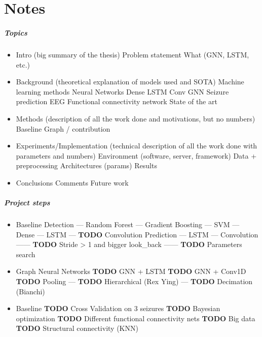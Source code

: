 
\chapter*{Notes}

\paragraph{Topics}
\begin{itemize}
    \item Intro (big summary of the thesis)
    \subitem Problem statement
    \subitem What (GNN, LSTM, etc.)
    \item Background (theoretical explanation of models used and SOTA)
    \subitem Machine learning methods
    \subitem Neural Networks
    \subitem Dense
    \subitem LSTM
    \subitem Conv
    \subitem GNN
    \subitem Seizure prediction
    \subitem EEG
    \subitem Functional connectivity network
    \subitem State of the art
    \item Methods (description of all the work done and motivations, but no numbers)
    \subitem Baseline
    \subitem Graph / contribution
    \item Experiments/Implementation (technical description of all the work done with parameters and numbers)
    \subitem Environment (software, server, framework)
    \subitem Data + preprocessing
    \subitem Architectures (params)
    \subitem Results
    \item Conclusions
    \subitem Comments
    \subitem Future work
\end{itemize}

\paragraph{Project steps}
\begin{itemize}
    \item Baseline
    \subitem Detection
    \subitem --- Random Forest
    \subitem --- Gradient Boosting
    \subitem --- SVM
    \subitem --- Dense
    \subitem --- LSTM
    \subitem --- \textbf{TODO} Convolution
    \subitem Prediction
    \subitem --- LSTM
    \subitem --- Convolution
    \subitem ------ \textbf{TODO} Stride > 1 and bigger look\_back
    \subitem ------ \textbf{TODO} Parameters search
    \item Graph Neural Networks
    \subitem \textbf{TODO} GNN + LSTM
    \subitem \textbf{TODO} GNN + Conv1D
    \subitem \textbf{TODO} Pooling
    \subitem --- \textbf{TODO} Hierarchical (Rex Ying)
    \subitem --- \textbf{TODO} Decimation (Bianchi)
    \item Baseline
    \subitem \textbf{TODO} Cross Validation on 3 seizures
    \subitem \textbf{TODO} Bayesian optimization
    \subitem \textbf{TODO} Different functional connectivity nets
    \subitem \textbf{TODO} Big data
    \subitem \textbf{TODO} Structural connectivity (KNN)
\end{itemize}


